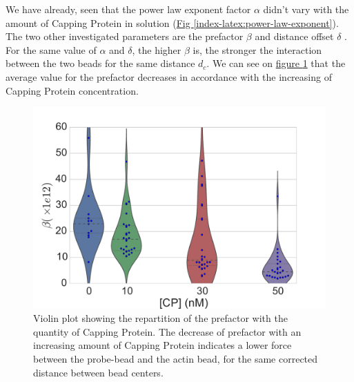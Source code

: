 \documentclass[A4paperpaper,11pt,english]{sphinxmanual}
\begin{document}
We have already,  seen  that the power law exponent factor \(\alpha\)
didn't vary with the amount of Capping Protein in solution (\hyperref[index-latex:power-law-exponent]{Fig  \ref*{index-latex:power-law-exponent}}).
The two other investigated parameters are the prefactor
\(\beta\) and distance offset \(\delta\) . For the same value of \(\alpha\) and \(\delta\), the
higher \(\beta\) is, the stronger the interaction between the two beads for
the same distance \(d_c\). We can see on \hyperref[index-latex:beta-violin]{figure  \ref*{index-latex:beta-violin}} that the
average value for the prefactor decreases in accordance with the increasing of Capping Protein
concentration.
\begin{figure}[htbp]
\centering
\capstart

\includegraphics[width=0.800\linewidth]{beta_violin.pdf}
\caption{Violin plot showing the repartition of the prefactor with the quantity of
Capping Protein. The decrease of prefactor with an increasing amount of Capping
Protein indicates a lower force between the probe-bead and the actin bead,
for the same corrected distance between bead centers.}\label{index-latex:beta-violin}\end{figure}
\end{document}
